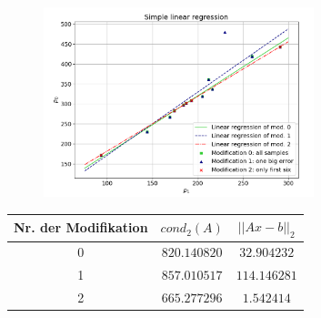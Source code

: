 \documentclass{beamer}
\begin{document}
\begin{frame}
  \begin{figure}
    \centering
      \includegraphics[width=0.7\textwidth]{Linear_Regression}
  \end{figure}
  \vspace{-1em}
  \centering
  \begin{tabular}{c|c|c}
    Nr. der Modifikation & $cond_2(A)$   & $||Ax-b||_2$\\ \hline
                       0 & $820.140820$  &  $32.904232$\\ \hline
                       1 & $857.010517$  & $114.146281$\\ \hline
                       2 & $665.277296$  &   $1.542414$
  \end{tabular}
\end{frame}
\end{document}

